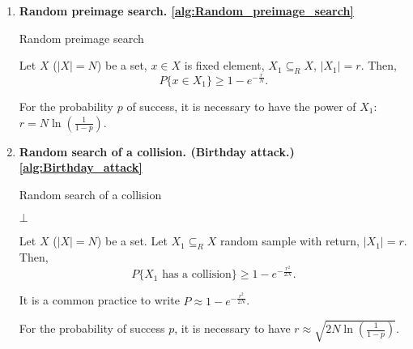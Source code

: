 \begin{enumerate}[noitemsep]
    \item \textbf{Random preimage search. \ref{alg:Random_preimage_search}}
        \begin{algorithm2e}[ht]
            \caption{Random preimage search}
            \label{alg:Random_preimage_search}
            

        \end{algorithm2e}
        \begin{lemma}
            Let $X$ ($|X| = N$) be a set, $x \in X$ is fixed element,
            $X_1 \subseteq_{R} X$, $|X_1| = r$. Then,
            $$P\{x \in X_1\} \geqslant 1 - e^{- \frac{r}{N}}.$$
        \end{lemma}
        \begin{corollary}
            For the probability $p$ of success,
            it is necessary to have the power of $X_1$: $r = N \ln(\frac{1}{1-p})$.
        \end{corollary}

    \item \textbf{Random search of a collision. (Birthday attack.) \ref{alg:Birthday_attack}}
        \begin{algorithm2e}[ht]
            \caption{Random search of a collision}
            \label{alg:Birthday_attack}
            


            \Return $\bot$\;
        \end{algorithm2e}
        \begin{lemma}
            Let $X$ ($|X| = N$) be a set.
            Let $X_1 \subseteq_{R} X$ random sample with return, $|X_1| = r$. Then,
            $$P\{X_1 \text{ has a collision}\} \geqslant 1 - e^{- \frac{r^2}{2N}}.$$
        \end{lemma}
        \begin{remark}
            It is a common practice to write $P \approx 1 - e^{- \frac{r^2}{2N}}$.
        \end{remark}
        \begin{corollary}
            For the probability of success $p$,
            it is necessary to have $r \approx \sqrt{2N \ln(\frac{1}{1-p})}$.
        \end{corollary}


\end{enumerate}
